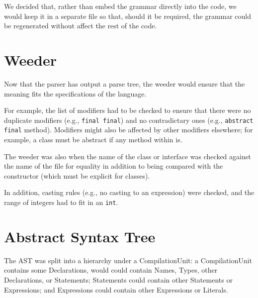 We decided that, rather than embed the grammar directly into the code, we would keep it in a separate file so that,
  should it be required, the grammar could be regenerated without affect the rest of the code.

\section{Weeder}
Now that the parser has output a parse tree, the weeder would ensure that the meaning fits the specifications of the language.

For example, the list of modifiers had to be checked to ensure that there were no duplicate modifiers (e.g., \verb|final final|)
  and no contradictary ones (e.g., \verb|abstract final| method).
Modifiers might also be affected by other modifiers elsewhere; for example, a class must be abstract if any method within is.

The weeder was also when the name of the class or interface was checked against the name of the file for equality
  in addition to being compared with the constructor (which must be explicit for classes).

In addition, casting rules (e.g., no casting to an expression) were checked,
  and the range of integers had to fit in an \verb|int|.

\section{Abstract Syntax Tree}
The AST was split into a hierarchy under a CompilationUnit:
  a CompilationUnit contains some Declarations, would could contain Names, Types, other Declarations, or Statements;
  Statements could contain other Statements or Expressions; and Expressions could contain other Expressions or Literals.


